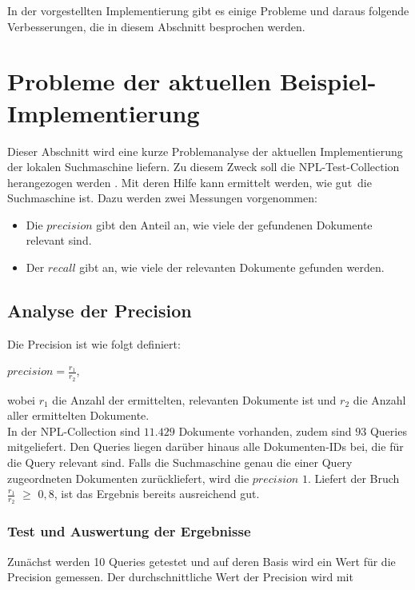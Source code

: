 In der vorgestellten Implementierung gibt es einige Probleme und daraus folgende Verbesserungen, die in diesem Abschnitt besprochen werden.

\section{Probleme der aktuellen Beispiel-Implementierung}
Dieser Abschnitt wird eine kurze Problemanalyse der aktuellen Implementierung der lokalen Suchmaschine liefern. Zu diesem Zweck soll die NPL-Test-Collection herangezogen werden \cite{npl_test_collection}. Mit deren Hilfe kann ermittelt werden, wie \glqq gut\grqq\ die Suchmaschine ist. Dazu werden zwei Messungen vorgenommen:

\begin{itemize}
	\item Die $precision$ gibt den Anteil an, wie viele der gefundenen Dokumente relevant sind.
	\item Der $recall$ gibt an, wie viele der relevanten Dokumente gefunden werden.
\end{itemize}

\subsection{Analyse der Precision}
Die Precision ist wie folgt definiert:

\begin{center}
	$\displaystyle precision = \frac{r_1}{r_2}$,
\end{center}

wobei $r_1$ die Anzahl der ermittelten, relevanten Dokumente ist und $r_2$ die Anzahl aller ermittelten Dokumente.\\
In der NPL-Collection sind $11.429$ Dokumente vorhanden, zudem sind $93$ Queries mitgeliefert. Den Queries liegen darüber hinaus alle Dokumenten-IDs bei, die für die Query relevant sind. Falls die Suchmaschine genau die einer Query zugeordneten Dokumenten zurückliefert, wird die $precision$ $1$.
Liefert der Bruch $\frac{r_1}{r_2}$ $\ge$ $0,8$, ist das Ergebnis bereits ausreichend gut.

\subsubsection{Test und Auswertung der Ergebnisse}
Zunächst werden 10 Queries getestet und auf deren Basis wird ein Wert für die Precision gemessen. 
Der durchschnittliche Wert der Precision wird mit


